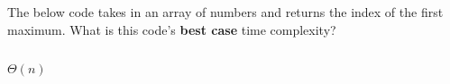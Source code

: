 \begin{prob}
    The below code takes in an array of numbers and returns the index of the first maximum.
    What is this code's \textbf{best case} time complexity?

    \inputminted{python}{./code.py}

    \begin{soln}
        $\Theta(n)$
    \end{soln}

\end{prob}
